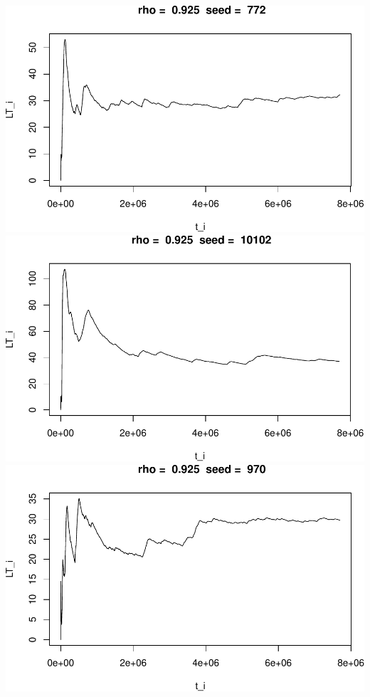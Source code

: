 \documentclass[]{article}
\begin{document}
\includegraphics{003_files/figure-latex/unnamed-chunk-23-1.pdf}
\includegraphics{003_files/figure-latex/unnamed-chunk-23-2.pdf}
\includegraphics{003_files/figure-latex/unnamed-chunk-23-3.pdf}
\end{document}
